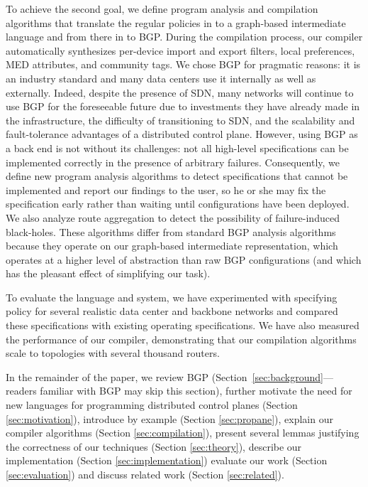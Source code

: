 To achieve the second goal, we define program analysis and compilation
algorithms that translate the regular policies in to a graph-based
intermediate language and from there in to BGP.  During the
compilation process, our compiler automatically synthesizes per-device
import and export filters, local preferences, MED attributes, and 
community tags.  We chose BGP for pragmatic reasons:  it is an industry
standard and many data centers use it internally as well as externally.
Indeed, despite the presence of SDN, many networks will continue to
use BGP for the foreseeable future due to investments they have already
made in the infrastructure, the difficulty of transitioning to SDN,
and the scalability and fault-tolerance advantages of a distributed
control plane.  However, using BGP as a back end is not without its 
challenges: not all high-level specifications can be implemented correctly in
the presence of arbitrary failures.  Consequently, we define new
program analysis algorithms to detect specifications that cannot be implemented
and report our findings to the user, so he or she may fix the specification
early rather than waiting until configurations have been deployed.  We also
analyze route aggregation to detect the possibility of failure-induced black-holes.
These algorithms differ from
standard BGP analysis algorithms~\cite{feamster:rcc,batfish} because they operate on 
our graph-based intermediate representation, which operates at a higher level
of abstraction than raw BGP configurations (and which has the pleasant effect of simplifying our 
task).

To evaluate the \sysname{} language and system, we have experimented with specifying policy
for several realistic data center and backbone networks and compared these specifications
with existing operating specifications. We have also
measured the performance of our compiler, demonstrating that our compilation
algorithms scale to topologies with several thousand routers.

In the remainder of the paper, we review BGP (Section~\ref{sec:background}---readers
familiar with BGP may skip this section),
further motivate the need for new languages 
for programming distributed control planes (Section \ref{sec:motivation}),
introduce \sysname{} by example (Section \ref{sec:propane}), 
explain our compiler algorithms (Section \ref{sec:compilation}),
present several lemmas justifying the correctness of our techniques (Section \ref{sec:theory}), describe our implementation (Section \ref{sec:implementation})
evaluate our work  (Section \ref{sec:evaluation}) and discuss related work (Section \ref{sec:related}).

